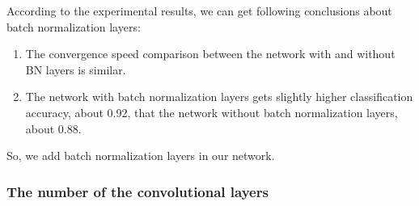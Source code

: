 According to the experimental results, we can get following conclusions about batch normalization layers: 
\begin{enumerate}
	\item The convergence speed comparison between the network with and without BN layers is similar.
	\item The network with batch normalization layers gets slightly higher classification accuracy, about 0.92, that the network without batch normalization layers, about 0.88.
\end{enumerate}
So, we add batch normalization layers in our network. 

\subsubsection{The number of the convolutional layers}
